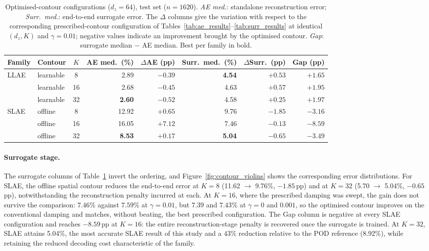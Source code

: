 ﻿\documentclass[a4paper,12pt]{article}
\theoremstyle{definition}
\theoremstyle{remark}
\begin{document}
\begin{table}[htbp]
    \centering
    \small
    \setlength{\tabcolsep}{4pt}
    \renewcommand{\arraystretch}{1.3}
    \begin{tabular}{llcrrrrr}
        \toprule
        \textbf{Family} & \textbf{Contour} & $K$
            & \textbf{AE med.\ (\%)} & $\Delta$\textbf{AE (pp)}
            & \textbf{Surr.\ med.\ (\%)} & $\Delta$\textbf{Surr.\ (pp)}
            & \textbf{Gap (pp)} \\
        \midrule
        \multirow{3}{*}{LLAE}
          & learnable &  8 & 2.89 & $-0.39$ & \textbf{4.54} & $+0.53$ & $+1.65$ \\
          & learnable & 16 & 2.68 & $-0.45$ & 4.63 & $+0.57$ & $+1.95$ \\
          & learnable & 32 & \textbf{2.60} & $-0.52$ & 4.58 & $+0.25$ & $+1.97$ \\
        \midrule
        \multirow{3}{*}{SLAE}
          & offline   &  8 & 12.92 & $+0.65$ &  9.76 & $-1.85$ & $-3.16$ \\
          & offline   & 16 & 16.05 & $+7.12$ &  7.46 & $-0.13$ & $-8.59$ \\
          & offline   & 32 &  \textbf{8.53} & $+0.17$ &  \textbf{5.04} & $-0.65$ & $-3.49$ \\
        \bottomrule
    \end{tabular}
    \caption{Optimised-contour configurations ($d_z=64$), test set ($n=1620$). \emph{AE med.}: standalone reconstruction error; \emph{Surr.\ med.}: end-to-end surrogate error. The $\Delta$ columns give the variation with respect to the corresponding prescribed-contour configuration of Tables~\ref{tab:ae_results}--\ref{tab:surr_results} at identical $(d_z, K)$ and $\gamma = 0.01$; negative values indicate an improvement brought by the optimised contour. \emph{Gap}: surrogate median $-$ AE median. Best per family in bold.}
    \label{tab:contour_results}
\end{table}

\paragraph{Surrogate stage.}
The surrogate columns of Table~\ref{tab:contour_results} invert the ordering, and Figure~\ref{fig:contour_violins} shows the corresponding error distributions. For SLAE, the offline spatial contour reduces the end-to-end error at $K=8$ (11.62 $\to$ 9.76\%, $-1.85$\,pp) and at $K=32$ (5.70 $\to$ 5.04\%, $-0.65$\,pp), notwithstanding the reconstruction penalty incurred at each. At $K=16$, where the prescribed damping was swept, the gain does not survive the comparison: $7.46$\% against $7.59$\% at $\gamma = 0.01$, but $7.39$ and $7.43$\% at $\gamma = 0$ and $0.001$, so the optimised contour improves on the conventional damping and matches, without beating, the best prescribed configuration. The Gap column is negative at every SLAE configuration and reaches $-8.59$\,pp at $K=16$: the entire reconstruction-stage penalty is recovered once the surrogate is trained. At $K=32$, SLAE attains 5.04\%, the most accurate SLAE result of this study and a $43\%$ reduction relative to the POD reference (8.92\%), while retaining the reduced decoding cost characteristic of the family.
\end{document}
